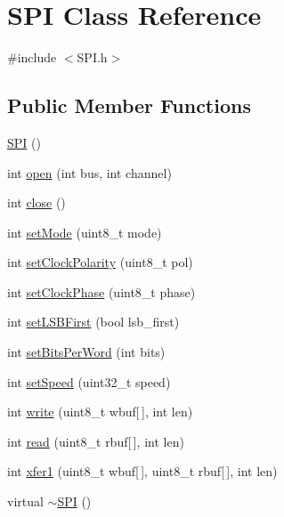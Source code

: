 \hypertarget{class_s_p_i}{\section{S\-P\-I Class Reference}
\label{class_s_p_i}
}


{\ttfamily \#include $<$S\-P\-I.\-h$>$}

\subsection*{Public Member Functions}
\begin{DoxyCompactItemize}
\item 
\hyperlink{class_s_p_i_a2ba081c29fbdecc704c6bf00b24d5205}{S\-P\-I} ()
\item 
int \hyperlink{class_s_p_i_a52ceb41efea8b56cd6c5fc20cd36ca33}{open} (int bus, int channel)
\item 
int \hyperlink{class_s_p_i_ab60d93bf6b639c0b4dad9da4f5854a94}{close} ()
\item 
int \hyperlink{class_s_p_i_a81ff077c6af077ef9d1ee2d56a8a310b}{set\-Mode} (uint8\-\_\-t mode)
\item 
int \hyperlink{class_s_p_i_afad281dadda690a5bb1ad456c2ddb924}{set\-Clock\-Polarity} (uint8\-\_\-t pol)
\item 
int \hyperlink{class_s_p_i_acc43a43a985c6e73723852d621324ef8}{set\-Clock\-Phase} (uint8\-\_\-t phase)
\item 
int \hyperlink{class_s_p_i_aedcab28ad20f691db0f3450ed825fd69}{set\-L\-S\-B\-First} (bool lsb\-\_\-first)
\item 
int \hyperlink{class_s_p_i_a4e6b7a9b89809663c91712ceff00920b}{set\-Bits\-Per\-Word} (int bits)
\item 
int \hyperlink{class_s_p_i_a3de287340d081fc813fd21269b014183}{set\-Speed} (uint32\-\_\-t speed)
\item 
int \hyperlink{class_s_p_i_a7349053056a1e712eb6f5c1f122186d0}{write} (uint8\-\_\-t wbuf\mbox{[}$\,$\mbox{]}, int len)
\item 
int \hyperlink{class_s_p_i_a001a78d9fbd2ea73b0fcb7b5efa816e0}{read} (uint8\-\_\-t rbuf\mbox{[}$\,$\mbox{]}, int len)
\item 
int \hyperlink{class_s_p_i_adcd3b90ca766fb1b69666cf3402726fe}{xfer1} (uint8\-\_\-t wbuf\mbox{[}$\,$\mbox{]}, uint8\-\_\-t rbuf\mbox{[}$\,$\mbox{]}, int len)
\item 
virtual \hyperlink{class_s_p_i_a6babebf1ea3e8ff0330f43a3e2312ac4}{$\sim$\-S\-P\-I} ()
\end{DoxyCompactItemize}


